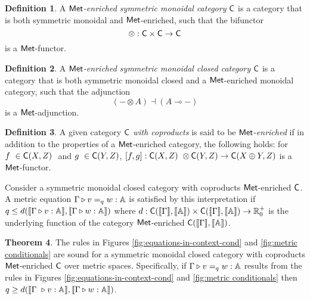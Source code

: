 \documentclass[10pt,a4paper]{amsart}
\theoremstyle{definition}
\newtheorem{definition}{Definition}[section]
\theoremstyle{definition}
\theoremstyle{definition}
\theoremstyle{definition}
\theoremstyle{definition}
\theoremstyle{definition}
\newtheorem{theorem}[definition]{Theorem}
\begin{document}
\begin{definition}
A \emph{$\mathsf{Met}$-enriched symmetric monoidal category} $\mathsf{C}$ is a category that is both symmetric monoidal and $\mathsf{Met}$-enriched, such that the bifunctor
\[
\otimes : \mathsf{C} \times \mathsf{C} \to \mathsf{C}
\]
is a $\mathsf{Met}$-functor. 
\end{definition}

\begin{definition}
  A \emph{$\mathsf{Met}$-enriched symmetric monoidal closed category} $\mathsf{C}$ is a category that is both symmetric monoidal closed and a $\mathsf{Met}$-enriched monoidal category, such that the adjunction
\[
(- \otimes A) \dashv (A \multimap -)
\]
is a $\mathsf{Met}$-adjunction.
\end{definition}


\begin{definition}
  A given category $\mathsf{C}$ \emph{with coproducts} is said to be $\mathsf{Met}$-\emph{enriched} if in addition to the properties of a  $\mathsf{Met}$-enriched category, the following holds: for $f  \in \catC(X,Z)  $ and $g  \in \catC(Y,Z) $, $ [f,g]:\catC(X,Z)  \otimes \catC(Y,Z) \rightarrow \catC(X \oplus Y,Z) $ is a $\mathsf{Met}$-functor.
 \end{definition}






Consider a symmetric monoidal closed category with coproducts $\mathsf{Met}$-enriched $\mathsf{C}$. A metric equation $\Gamma \triangleright v =_{q} w : \mathbb{A} $ is satisfied by this interpretation if $q \leq d( \llbracket \Gamma  \triangleright v : \mathbb{A} \rrbracket, \llbracket\Gamma \triangleright w : \mathbb{A} \rrbracket)$ where $d : \mathsf{C}(\llbracket \Gamma \rrbracket, \llbracket \mathbb{A} \rrbracket) \times \mathsf{C}(\llbracket \Gamma \rrbracket, \llbracket \mathbb{A} \rrbracket) \rightarrow \mathbb{R}_0^+$ is the underlying function of the category  $\mathsf{Met}$-enriched $\mathsf{C}(\llbracket \Gamma \rrbracket, \llbracket \mathbb{A} \rrbracket)$.

\begin{theorem}
  The rules in Figures \ref{fig:equations-in-context-cond} and \ref{fig:metric conditionals} are sound for a symmetric monoidal closed category with coproducts $\mathsf{Met}$-enriched $\mathsf{C}$ over metric spaces. Specifically, if $\Gamma \triangleright v =_{q} w : \mathbb{A} $ results from the rules in Figures \ref{fig:equations-in-context-cond} and \ref{fig:metric conditionals} then $q \geq d( \llbracket \Gamma  \vljud v : \typeA \rrbracket, \llbracket\Gamma \vljud w : \typeA \rrbracket)$.
\end{theorem}
\end{document}
